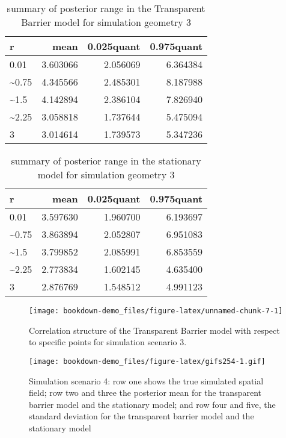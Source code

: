 \documentclass[
]{book}
\begin{document}
\begin{table}

\caption{\label{tab:unnamed-chunk-5}summary of posterior range in the Transparent Barrier model for simulation geometry 3}
\centering
\begin{tabular}[t]{l|r|r|r}
\hline
r & mean & 0.025quant & 0.975quant\\
\hline
0.01 & 3.603066 & 2.056069 & 6.364384\\
\hline
\textasciitilde{}0.75 & 4.345566 & 2.485301 & 8.187988\\
\hline
\textasciitilde{}1.5 & 4.142894 & 2.386104 & 7.826940\\
\hline
\textasciitilde{}2.25 & 3.058818 & 1.737644 & 5.475094\\
\hline
3 & 3.014614 & 1.739573 & 5.347236\\
\hline
\end{tabular}
\end{table}

\begin{table}

\caption{\label{tab:unnamed-chunk-6}summary of posterior range in the stationary model for simulation geometry 3}
\centering
\begin{tabular}[t]{l|r|r|r}
\hline
r & mean & 0.025quant & 0.975quant\\
\hline
0.01 & 3.597630 & 1.960700 & 6.193697\\
\hline
\textasciitilde{}0.75 & 3.863894 & 2.052807 & 6.951083\\
\hline
\textasciitilde{}1.5 & 3.799852 & 2.085991 & 6.853559\\
\hline
\textasciitilde{}2.25 & 2.773834 & 1.602145 & 4.635400\\
\hline
3 & 2.876769 & 1.548512 & 4.991123\\
\hline
\end{tabular}
\end{table}

\begin{figure}
\texttt{[image: bookdown-demo\_files/figure-latex/unnamed-chunk-7-1]} \caption{Correlation structure of the Transparent Barrier model with respect to specific points for simulation scenario 3.}\label{fig:unnamed-chunk-7}
\end{figure}

\begin{figure}
\centering
\texttt{[image: bookdown-demo\_files/figure-latex/gifs254-1.gif]}
\caption{\label{fig:gifs254}Simulation scenario 4: row one shows the true simulated spatial field; row two and three the posterior mean for the transparent barrier model and the stationary model; and row four and five, the standard deviation for the transparent barrier model and the stationary model}
\end{figure}
\end{document}
